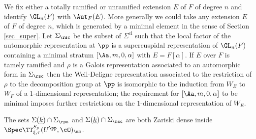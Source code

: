 We fix either a totally ramified or unramified extension $E$ of $F$ of degree $n$ and identify $\GL_n(F)$ with $\Aut_F(E)$. More generally we could take
any extension $E$ of $F$ of degree $n$, which is generated by a minimal element in the sense of Section \ref{sec_super}. Let $\Sigma_{\rsc}$ be the subset
of $\Sigma^{\mathrm{cl}}$ such that the local factor of the automorphic representation at $\pp$ is a supercuspidal representation of $\GL_n(F)$ containing a
minimal stratum $[\Aa, m, 0, \alpha]$ with $E= F[\alpha]$. If $E$ over $F$ is tamely ramified and $\rho$ is a Galois representation associated to an automorphic form
in $\Sigma_{\rsc}$ then the Weil-Deligne representation associated to
the restriction of $\rho$ to the decomposition group at $\pp$ is isomorphic to the induction from $W_E$ to $W_F$ of a $1$-dimensional representation; the
requirement for $[\Aa, m, 0, \alpha]$ to be minimal
imposes further restrictions on the $1$-dimensional representation of $W_E$.

\begin{thm}\label{dense_hecke} The sets $\Sigma(\underline{k})\cap \Sigma_{\rps}$ and $\Sigma(\underline{k})\cap \Sigma_{\rsc}$ are both Zariski dense inside $\Spec \TT^{S_p}_{\xi, \tau}(U^{\pp}, \cO)_{\mm}$.
\end{thm}

